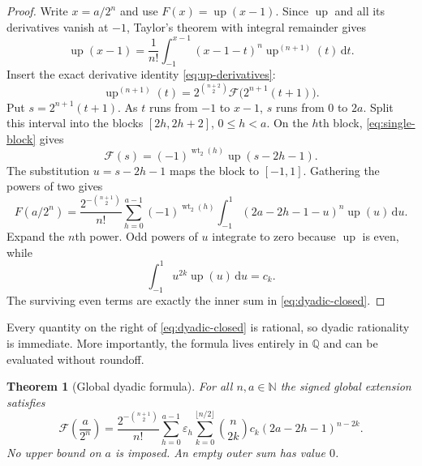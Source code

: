 \documentclass[11pt,oneside]{article}
\newtheorem{theorem}{Theorem}[section]
\theoremstyle{definition}
\theoremstyle{remark}
\newcommand{\Q}{\mathbb Q}
\newcommand{\N}{\mathbb N}
\newcommand{\Up}{\operatorname{up}}
\newcommand{\wt}{\operatorname{wt}_2}
\newcommand{\dd}{\,\mathrm d}
\begin{document}
\begin{proof}
Write $x=a/2^n$ and use $F(x)=\Up(x-1)$.  Since $\Up$ and all its derivatives vanish at
$-1$, Taylor's theorem with integral remainder gives
\begin{equation}
 \Up(x-1)=\frac1{n!}\int_{-1}^{x-1}(x-1-t)^n\Up^{(n+1)}(t)\dd t. \label{eq:dyadic-taylor-integral}
\end{equation}
Insert the exact derivative identity \eqref{eq:up-derivatives}:
\begin{equation*}
 \Up^{(n+1)}(t)=2^{\binom{n+2}{2}}
 \mathcal F\bigl(2^{n+1}(t+1)\bigr).
\end{equation*}
Put $s=2^{n+1}(t+1)$.  As $t$ runs from $-1$ to $x-1$, $s$ runs from $0$ to $2a$.
Split this interval into the blocks $[2h,2h+2]$, $0\le h<a$.  On the $h$th block,
\eqref{eq:single-block} gives
\begin{equation*}
 \mathcal F(s)=(-1)^{\wt(h)}\Up(s-2h-1).
\end{equation*}
The substitution $u=s-2h-1$ maps the block to $[-1,1]$.  Gathering the powers of two gives
\begin{equation}
 F(a/2^n)=\frac{2^{-\binom{n+1}{2}}}{n!}
 \sum_{h=0}^{a-1}(-1)^{\wt(h)}
 \int_{-1}^{1}(2a-2h-1-u)^n\Up(u)\dd u.                  \label{eq:dyadic-before-moments}
\end{equation}
Expand the $n$th power.  Odd powers of $u$ integrate to zero because $\Up$ is even, while
\begin{equation*}
 \int_{-1}^{1}u^{2k}\Up(u)\dd u=c_k.
\end{equation*}
The surviving even terms are exactly the inner sum in \eqref{eq:dyadic-closed}.
\end{proof}

Every quantity on the right of \eqref{eq:dyadic-closed} is rational, so dyadic rationality is
immediate.  More importantly, the formula lives entirely in $\Q$ and can be evaluated without
roundoff.


\begin{theorem}[Global dyadic formula]
\label{thm:dy-global-closed}
For all $n,a\in\N$ the signed global extension satisfies
\begin{equation}
\boxed{
 \mathcal F\!\left(\frac{a}{2^n}\right)
 =\frac{2^{-\binom{n+1}{2}}}{n!}
 \sum_{h=0}^{a-1}\varepsilon_h
 \sum_{k=0}^{\lfloor n/2\rfloor}
 \binom n{2k}c_k(2a-2h-1)^{n-2k}.}
                                                               \label{eq:dy-global-closed}
\end{equation}
No upper bound on $a$ is imposed.  An empty outer sum has value $0$.
\end{theorem}
\end{document}
